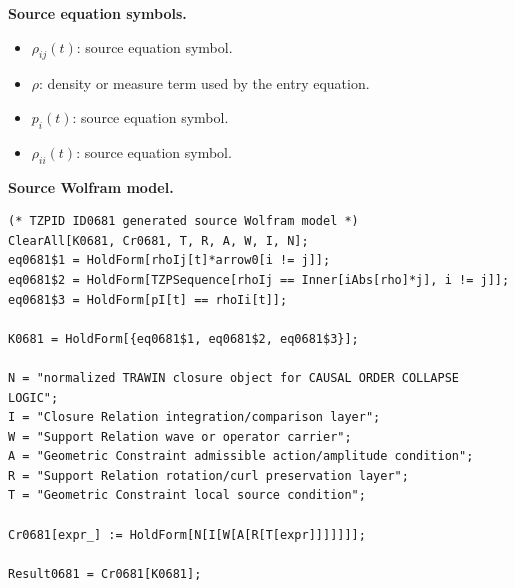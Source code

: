 \begin{minipage}[t]{0.49\linewidth}
\begingroup
\small
\raggedright
\textbf{Source equation symbols.}\par
\begin{itemize}[leftmargin=1.35em,itemsep=1pt,topsep=1pt,parsep=0pt]
    \item $\rho_{ij}(t)$: source equation symbol.
    \item $\rho$: density or measure term used by the entry equation.
    \item $p_i(t)$: source equation symbol.
    \item $\rho_{ii}(t)$: source equation symbol.
\end{itemize}
\endgroup
\end{minipage}\hfill
\begin{minipage}[t]{0.47\linewidth}
\begingroup
\scriptsize
\raggedright
\textbf{Source Wolfram model.}\par
\begin{Verbatim}[fontsize=\tiny,breaklines=true,breakanywhere=true]
(* TZPID ID0681 generated source Wolfram model *)
ClearAll[K0681, Cr0681, T, R, A, W, I, N];
eq0681$1 = HoldForm[rhoIj[t]*arrow0[i != j]];
eq0681$2 = HoldForm[TZPSequence[rhoIj == Inner[iAbs[rho]*j], i != j]];
eq0681$3 = HoldForm[pI[t] == rhoIi[t]];

K0681 = HoldForm[{eq0681$1, eq0681$2, eq0681$3}];

N = "normalized TRAWIN closure object for CAUSAL ORDER COLLAPSE LOGIC";
I = "Closure Relation integration/comparison layer";
W = "Support Relation wave or operator carrier";
A = "Geometric Constraint admissible action/amplitude condition";
R = "Support Relation rotation/curl preservation layer";
T = "Geometric Constraint local source condition";

Cr0681[expr_] := HoldForm[N[I[W[A[R[T[expr]]]]]]];

Result0681 = Cr0681[K0681];
\end{Verbatim}
\endgroup
\end{minipage}

